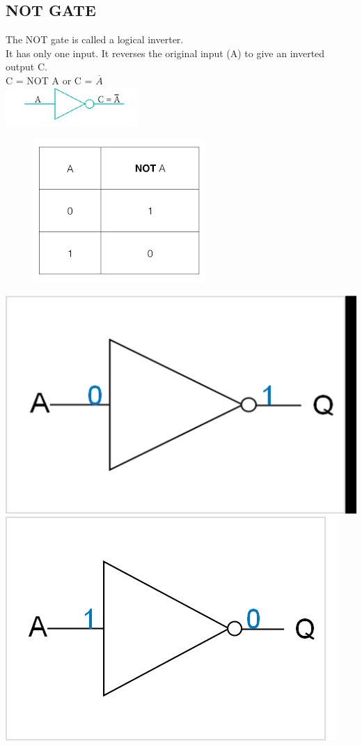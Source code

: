 \documentclass{article}
\begin{document}
\subsection{NOT GATE}
The NOT gate is called a logical inverter.\\
It has only one input. It reverses the original input (A) to give an inverted output C.\\
C = NOT A or C = $\overline{A}$\\
\includegraphics{Picture 3.png}\\
\begin{figure}[h!]
	\centering
	\includegraphics[width=0.5\linewidth]{Unknown-3}
\end{figure}
\newpage
\includegraphics[width=0.3\linewidth]{Picture 4.png} \includegraphics[width=0.3\linewidth]{Picture 4-1.png}
\newpage
\end{document}
